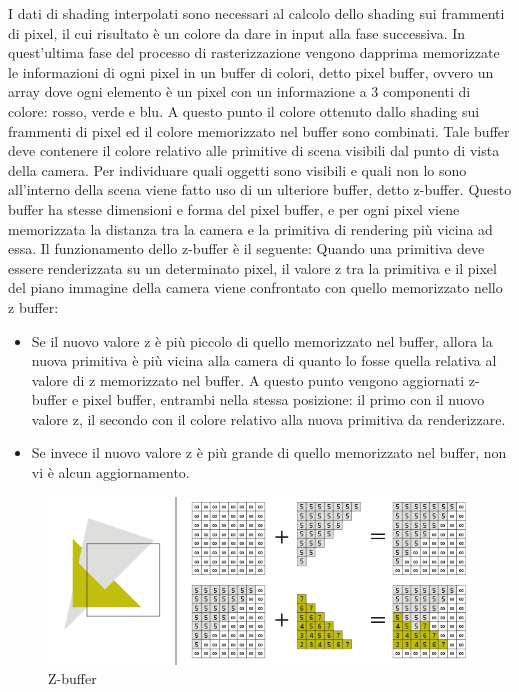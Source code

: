 I dati di shading interpolati sono necessari al calcolo dello shading sui frammenti di pixel, il cui risultato è un colore da dare in input alla fase successiva.
In quest’ultima fase del processo di rasterizzazione vengono dapprima memorizzate le informazioni di ogni pixel in un buffer di colori, detto pixel buffer, ovvero un array dove ogni elemento è un pixel con un informazione a 3 componenti di colore: rosso, verde e blu.
A questo punto il colore ottenuto dallo shading sui frammenti di pixel ed il colore memorizzato nel buffer sono combinati.
Tale buffer deve contenere il colore relativo alle primitive di scena visibili dal punto di vista della camera. 
Per individuare quali oggetti sono visibili e quali non lo sono all’interno della scena viene fatto uso di un ulteriore buffer, detto z-buffer. Questo buffer ha stesse dimensioni e forma del pixel buffer, e per ogni pixel viene memorizzata la distanza tra la camera e la primitiva di rendering più vicina ad essa. Il funzionamento dello z-buffer è il seguente: 
Quando una primitiva deve essere renderizzata su un determinato pixel, il valore z tra la primitiva e il pixel del piano immagine della camera viene confrontato con quello memorizzato nello z buffer:

\begin{itemize}
\item Se il nuovo valore z è più piccolo di quello memorizzato nel buffer, allora la nuova primitiva è più vicina alla camera di quanto lo fosse quella relativa al valore di z memorizzato nel buffer. A questo punto vengono aggiornati z-buffer e pixel buffer, entrambi nella stessa posizione: il primo con il nuovo valore z, il secondo con il colore relativo alla nuova primitiva da renderizzare. 
\item Se invece il nuovo valore z è più grande di quello memorizzato nel buffer, non vi è alcun aggiornamento.
\end{itemize}

\begin{figure}[htb]
 \centering
 \includegraphics[width=1.0\linewidth]{images/chapter_stato_arte/stato_arte_z_buffer.png}\hfill
 \caption[Z-buffer]{Z-buffer}
 \label{fig:stato_arte_z_buffer}
\end{figure}

